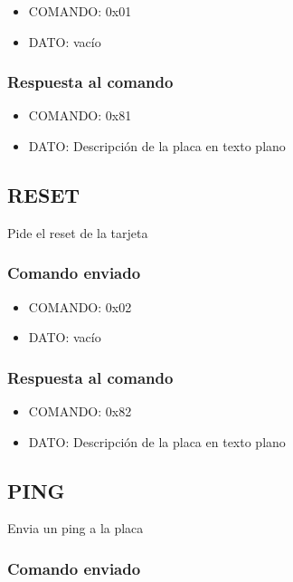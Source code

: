 \documentclass[a4paper,10pt]{article}
\begin{document}
\begin{itemize}
	\item{COMANDO:} 0x01
	\item{DATO:} vac\'io
\end{itemize}

\subsubsection*{Respuesta al comando}
\label{init_respuesta}

\begin{itemize}
	\item{COMANDO:} 0x81
	\item{DATO:} Descripci\'on de la placa en texto plano
\end{itemize}

\subsection{RESET}
\label{reset}

Pide el reset de la tarjeta

\subsubsection*{Comando enviado}
\label{reset_comando_enviado}

\begin{itemize}
	\item{COMANDO:} 0x02
	\item{DATO:} vac\'io
\end{itemize}

\subsubsection*{Respuesta al comando}
\label{reset_respuesta}

\begin{itemize}
	\item{COMANDO:} 0x82
	\item{DATO:} Descripci\'on de la placa en texto plano
\end{itemize}

\subsection{PING}
\label{ping}

Envia un ping a la placa

\subsubsection*{Comando enviado}
\label{ping_comando_enviado}
\end{document}
